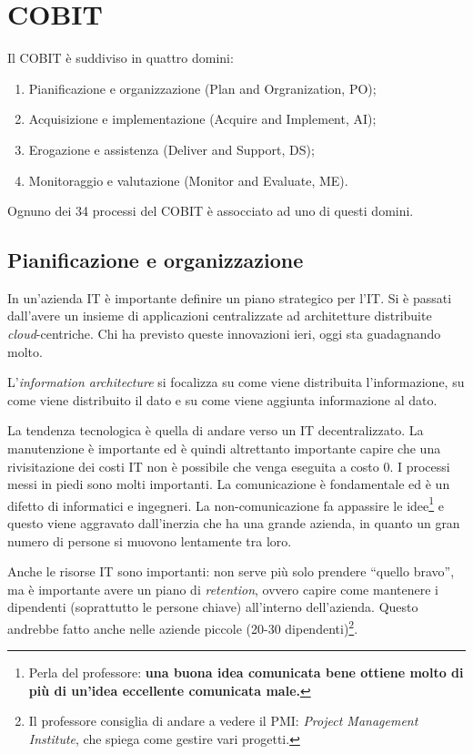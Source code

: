 \section{COBIT}
\label{COBIT}

Il COBIT è suddiviso in quattro domini:
\begin{enumerate}
  \item Pianificazione e organizzazione (Plan and Orgranization, PO);
  \item Acquisizione e implementazione (Acquire and Implement, AI);
  \item Erogazione e assistenza (Deliver and Support, DS);
  \item Monitoraggio  e valutazione (Monitor and Evaluate, ME).
\end{enumerate}
Ognuno dei 34 processi del COBIT è assocciato ad uno di questi domini.

\subsection{Pianificazione e organizzazione}

In un'azienda IT è importante definire un piano strategico per l'IT. Si è
passati dall'avere un insieme di applicazioni centralizzate ad architetture
distribuite \textit{cloud}-centriche. Chi ha previsto queste innovazioni ieri,
oggi sta guadagnando molto.

L'\textit{information architecture} si focalizza su come viene distribuita
l'informazione, su come viene distribuito il dato e su come viene aggiunta
informazione al dato.

La tendenza tecnologica è quella di andare verso un IT decentralizzato. La
manutenzione è importante ed è quindi altrettanto importante capire che una
rivisitazione dei costi IT non è possibile che venga eseguita a costo 0. I
processi messi in piedi sono molti importanti. La comunicazione è fondamentale
ed è un difetto di informatici e ingegneri. La non-comunicazione fa appassire
le idee\footnote{Perla del professore: \textbf{una buona idea comunicata bene
ottiene molto di più di un'idea eccellente comunicata male.}} e questo viene
aggravato dall'inerzia che ha una grande azienda, in quanto un gran numero di
persone si muovono lentamente tra loro.

Anche le risorse IT sono importanti: non serve più solo prendere ``quello
bravo'', ma è importante avere un piano di \textit{retention}, ovvero capire
come mantenere i dipendenti (soprattutto le persone chiave) all'interno
dell'azienda. Questo andrebbe fatto anche nelle aziende piccole (20-30
dipendenti)\footnote{Il professore consiglia di andare a vedere il PMI:
\textit{Project Management Institute}, che spiega come gestire vari progetti.}.

